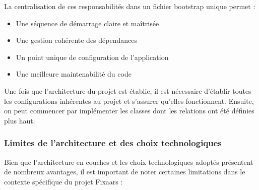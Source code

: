 \begin{enumerate}
\vspace{0.35cm}

La centralisation de ces responsabilités dans un fichier bootstrap unique permet :

\begin{itemize}
    \item Une séquence de démarrage claire et maîtrisée
    \item Une gestion cohérente des dépendances
    \item Un point unique de configuration de l'application
    \item Une meilleure maintenabilité du code
\end{itemize}

Une fois que l'architecture du projet est établie, il est nécessaire d'établir toutes les configurations inhérentes au projet et s'assurer qu'elles fonctionnent. Ensuite, on peut commencer par implémenter les classes dont les relations ont été définies plus haut.

\end{enumerate}

\subsubsection*{Limites de l'architecture et des choix technologiques}
Bien que l'architecture en couches et les choix technologiques adoptés présentent de nombreux avantages, il est important de noter certaines limitations dans le contexte spécifique du projet Fixaars :

